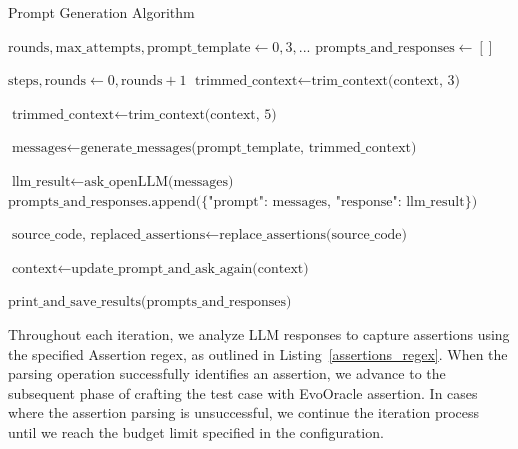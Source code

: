\begin{algorithm}
    \caption{Prompt Generation Algorithm}
    \label{algorithm_prompt_generation}
    \begin{algorithmic}[1]
            \State $\text{rounds}, \text{max\_attempts}, \text{prompt\_template} \gets 0, 3, \text{...}$
            \State $\text{prompts\_and\_responses} \gets []$
            
                \State $\text{steps}, \text{rounds} \gets 0, \text{rounds} + 1$
                    \State $\text{trimmed\_context} \gets \text{trim\_context(context, 3)}$
                \EndIf
                
                    \State $\text{trimmed\_context} \gets \text{trim\_context(context, 5)}$
                \EndIf
                
                \State $\text{messages} \gets \text{generate\_messages(prompt\_template, trimmed\_context)}$
                
                \State $\text{llm\_result} \gets \text{ask\_openLLM(messages)}$
                \State $\text{prompts\_and\_responses.append(\{"prompt": messages, "response": llm\_result\})}$
                
                \State $\text{source\_code, replaced\_assertions} \gets \text{replace\_assertions(source\_code)}$
                
                    \State $\text{context} \gets \text{update\_prompt\_and\_ask\_again(context)}$
                \EndIf
            \EndWhile
            
            \State $\text{print\_and\_save\_results(prompts\_and\_responses)}$
        \EndFunction
    \end{algorithmic}
\end{algorithm}

Throughout each iteration, we analyze LLM responses to capture assertions using the specified Assertion regex, as outlined in Listing~\ref{assertions_regex}. When the parsing operation successfully identifies an assertion, we advance to the subsequent phase of crafting the test case with EvoOracle assertion. In cases where the assertion parsing is unsuccessful, we continue the iteration process until we reach the budget limit specified in the configuration. 

